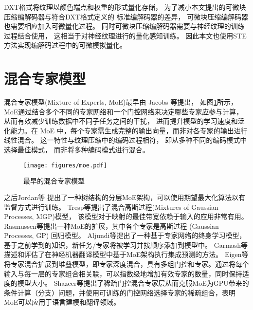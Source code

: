 DXT格式将纹理以颜色端点和权重的形式量化存储，
为了减小本文提出的可微块压缩编解码器与符合DXT格式定义的
标准编解码器的差异，
可微块压缩编解码器也需要相应加入可微量化过程。
同时可微块压缩编解码器需要与神经纹理的训练过程结合使用，
这相当于对神经纹理进行的量化感知训练。
因此本文也使用STE方法实现编解码过程中的可微模拟量化。


\section{混合专家模型}

混合专家模型(Mixture of Experts, MoE)最早由 Jacobs 等\cite{jacobs1991adaptive}提出，
如图\ref{fig:MoE}所示，MoE通过结合多个不同的专家网络和一个门控网络来决定哪些专家应参与计算，从而有效减少训练数据中不同子任务之间的干扰，
进而提升模型的学习速度和泛化能力。在 MoE 中，每个专家需生成完整的输出向量，而非对各专家的输出进行线性混合。
这一特性与纹理压缩中的编码过程相符，
即从多种不同的编码模式中选择最佳模式，
而非将多种编码模式进行混合。

\begin{figure}[htbp]
    \centering
    \texttt{[image: figures/moe.pdf]}
    \caption{最早的混合专家模型\cite{jacobs1991adaptive}}
    \label{fig:MoE}
\end{figure}

之后Jordan等\cite{jordan1994hierarchical}
提出了一种树结构的分层MoE架构，可以使用期望最大化算法以有监督方式进行训练。
Tresp等\cite{tresp2001mixtures}提出了混合高斯过程(Mixtures of Gaussian Processes, MGP)模型，
该模型对于映射的最佳带宽依赖于输入的应用非常有用。
Rasmussen等\cite{rasmussen2001infinite}提出一种MoE的扩展，其中各个专家是高斯过程 (Gaussian Processes, GP) 回归模型。
Aljundi等\cite{aljundi2017expert}提出了一种基于专家网络的终身学习模型，基于之前学到的知识，新任务/专家将被学习并按顺序添加到模型中。
Garmash等\cite{garmash2016ensemble}描述和评估了在神经机器翻译模型中基于MoE架构执行集成预测的方法。
Eigen等\cite{eigen2013learning}将专家混合扩展到堆叠模型，即专家深度混合，具有多组门控和专家。通过将每个输入与每一层的专家组合相关联，可以指数级地增加有效专家的数量，同时保持适度的模型大小。
Shazeer等\cite{shazeer2017outrageously}提出了稀疏门控混合专家层从而克服MoE为GPU带来的条件计算（分支）问题，并使用可训练的门控网络选择专家的稀疏组合，表明MoE可以应用于语言建模和翻译领域。

